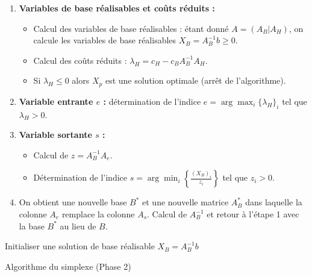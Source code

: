 \documentclass[12pt]{article}
\begin{document}
\begin{enumerate}
    \item \textbf{Variables de base réalisables et coûts réduits :}
    \begin{itemize}
        \item Calcul des variables de base réalisables : étant donné $A = (A_B | A_H)$, on calcule les variables de base réalisables $X_B = A_B^{-1}b \geq 0$.
        \item Calcul des coûts réduits : $\lambda_H = c_H - c_B A_B^{-1} A_H$.
        \item Si $\lambda_H \leq 0$ alors $X_p$ est une solution optimale (arrêt de l'algorithme).
    \end{itemize}
    \item \textbf{Variable entrante $e$ :} détermination de l'indice $e = \arg\max_i \{ \lambda_H \}_i$ tel que $\lambda_H > 0$.
    \item \textbf{Variable sortante $s$ :}
    \begin{itemize}
        \item Calcul de $z = A_B^{-1} A_e$.
        \item Détermination de l'indice $s = \arg\min_i \left\{ \frac{(X_B)_i}{z_i} \right\}$ tel que $z_i > 0$.
    \end{itemize}
    \item On obtient une nouvelle base $B^*$ et une nouvelle matrice $A_B^*$ dans laquelle la colonne $A_e$ remplace la colonne $A_s$. Calcul de $A_B^{-1}$ et retour à l'étape 1 avec la base $B^*$ au lieu de $B$.
\end{enumerate}





\begin{algorithm}[H]
    \SetAlgoLined
    \BlankLine
    Initialiser une solution de base réalisable $X_B = A_B^{-1}b$ \;
    \caption{Algorithme du simplexe (Phase 2)}
    \end{algorithm}
\end{document}
